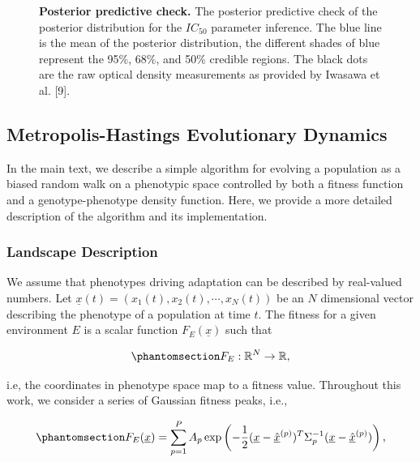 \documentclass[
]{scrartcl}
\begin{document}
\begin{refsection}
\begin{figure}
{}

\caption{\label{fig-ic50-ppc}\textbf{Posterior predictive check.} The
posterior predictive check of the posterior distribution for the
\(IC_{50}\) parameter inference. The blue line is the mean of the
posterior distribution, the different shades of blue represent the 95\%,
68\%, and 50\% credible regions. The black dots are the raw optical
density measurements as provided by Iwasawa et al. {[}9{]}.}

\end{figure}%

\subsection{Metropolis-Hastings Evolutionary
Dynamics}\label{sec-metropolis}

In the main text, we describe a simple algorithm for evolving a
population as a biased random walk on a phenotypic space controlled by
both a fitness function and a genotype-phenotype density function. Here,
we provide a more detailed description of the algorithm and its
implementation.

\subsubsection{Landscape Description}\label{landscape-description}

We assume that phenotypes driving adaptation can be described by
real-valued numbers. Let
\(\underline{x}(t) = (x_1(t), x_2(t), \cdots, x_N(t))\) be an \(N\)
dimensional vector describing the phenotype of a population at time
\(t\). The fitness for a given environment \(E\) is a scalar function
\(F_E(\underline{x})\) such that

\begin{equation}\phantomsection\label{eq-fitnes}{
F_E: \mathbb{R}^N \to \mathbb{R},
}\end{equation}

i.e, the coordinates in phenotype space map to a fitness value.
Throughout this work, we consider a series of Gaussian fitness peaks,
i.e.,

\begin{equation}\phantomsection\label{eq-fitness-peaks}{
F_E(\underline{x}) = 
\sum_{p=1}^P A_p 
\exp\left(
    -\frac{1}{2}
    (\underline{x} - \underline{\hat{x}}^{(p)})^T 
    \Sigma_p^{-1} 
    (\underline{x} - \underline{\hat{x}}^{(p)})
\right),
}\end{equation}


\end{refsection}
\end{document}
